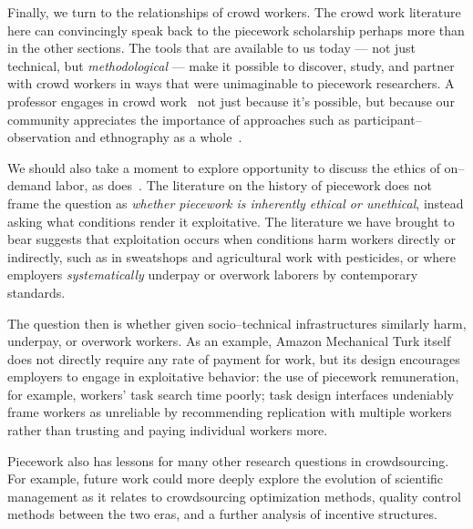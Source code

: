 \documentclass[trackingWork]{subfiles}
\begin{document}
Finally, we turn to the relationships of crowd workers.
The crowd work literature here can convincingly speak back to
the piecework scholarship perhaps more than in the other sections.
The tools that are available to us today
--- not just technical, but \textit{methodological} ---
make it possible to
discover, study, and partner with 
crowd workers in ways that were unimaginable to piecework researchers.
A professor engages in crowd work~\cite{bighamHalfWorkday}
not just because it's possible, but because our community
appreciates the importance of approaches such as participant--observation and ethnography as a whole~\cite{olson2014ways}.

We should also take a moment to explore opportunity to discuss the ethics of on--demand labor,
as \citeauthor{williamson2016} does~\cite{williamson2016}.
The literature on the history of piecework does not
frame the question as \textit{whether piecework is inherently ethical or unethical},
instead asking what conditions render it exploitative.
The literature we have brought to bear suggests that exploitation occurs when
conditions harm workers directly or indirectly, such as
in sweatshops and agricultural work with pesticides, or where
employers \textit{systematically} underpay or overwork laborers by contemporary standards.

The question then is
whether given socio--technical infrastructures %
similarly harm, underpay, or overwork workers.
As an example, Amazon Mechanical Turk itself does not directly require any rate of payment for work,
but its design encourages employers to engage in exploitative behavior:
the use of piecework remuneration, for example, workers' task search time poorly;
task design interfaces undeniably frame
workers as unreliable by recommending
replication with multiple workers rather than
trusting and paying individual workers more.


Piecework also has lessons for many other research questions in crowdsourcing.
For example, future work could more deeply explore the evolution of
scientific management as it relates to
crowdsourcing optimization methods,
quality control methods between the two eras, and
a further analysis of incentive structures.



\end{document}
